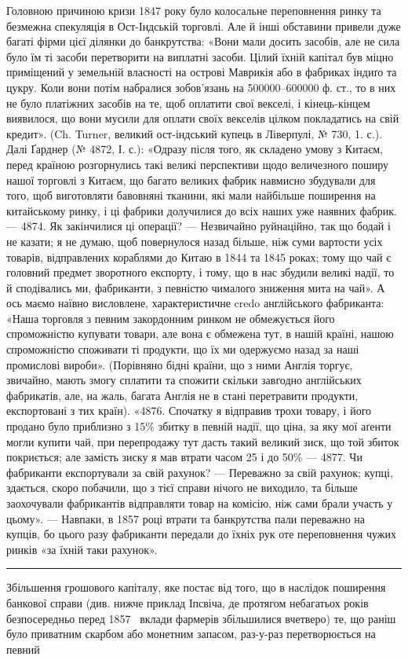 Головною причиною кризи 1847 року було колосальне переповнення ринку
та безмежна спекуляція в Ост-Індській торговлі. Але й інші обставини привели
дуже багаті фірми цієї ділянки до банкрутства: «Вони мали досить засобів, але не
сила було їм ті засоби перетворити на виплатні засоби. Цілий їхній капітал був міцно
приміщений у земельній власності на острові Маврикія або в фабриках індиґо та
цукру. Коли вони потім набралися зобов’язань на 500000--600000 ф. ст., то
в них не було платіжних засобів на те, щоб оплатити свої векселі, і кінець-кінцем
виявилося, що вони мусили для оплати своїх векселів цілком покладатись
на свій кредит». (Ch. Turner, великий ост-індський купець в Ліверпулі, № 730,
1. с.). Далі Ґарднер (№ 4872, І. с.): «Одразу після того, як складено умову
з Китаєм, перед країною розгорнулись такі великі перспективи щодо величезного
поширу нашої торговлі з Китаєм, що багато великих фабрик навмисно збудували
для того, щоб виготовляти бавовняні тканини, які мали найбільше поширення на китайському
ринку, і ці фабрики долучилися до всіх наших уже наявних фабрик. —
4874. Як закінчилися ці операції? — Незвичайно руйнаційно, так що бодай і не казати;
я не думаю, щоб повернулося назад більше, ніж  суми вартости усіх товарів,
відправлених кораблями до Китаю в 1844 та 1845 роках; тому що чай є головний
предмет зворотного експорту, і тому, що в нас збудили великі надії, то й сподівались ми,
фабриканти, з певністю чималого зниження мита на чай». А ось маємо наївно висловлене,
характеристичне credo англійського фабриканта: «Наша торговля з певним
закордонним ринком не обмежується його спроможністю купувати товари, але вона
є обмежена тут, в нашій країні, нашою спроможністю споживати ті продукти,
що їх ми одержуємо назад за наші промислові вироби». (Порівняно бідні країни,
що з ними Англія торгує, звичайно, мають змогу сплатити та спожити скільки
завгодно англійських фабрикатів, але, на жаль, багата Англія не в стані перетравити
продукти, експортовані з тих країн). «4876. Спочатку я відправив трохи
товару, і його продано було приблизно з 15\% збитку в певній надії, що ціна, за
яку мої аґенти могли купити чай, при перепродажу тут дасть такий великий
зиск, що той збиток покриється; але замість зиску я мав втрати часом 25 і до
50\% — 4877. Чи фабриканти експортували за свій рахунок? — Переважно за свій
рахунок; купці, здається, скоро побачили, що з тієї справи нічого не виходило, та
більше заохочували фабрикантів відправляти товар на комісію, ніж сами брали
участь у цьому». — Навпаки, в 1857 році втрати та банкрутства пали переважно
на купців, бо цього разу фабриканти передали до їхніх рук оте переповнення чужих
ринків «за їхній таки рахунок».

\pfbreak

Збільшення грошового капіталу, яке постає від того, що в наслідок поширення
банкової справи (див. нижче приклад Іпсвіча, де протягом небагатьох років
безпосередньо перед 1857~ вклади фармерів збільшилися вчетверо) те, що раніш було
приватним скарбом або монетним запасом, раз-у-раз перетворюється на певний
\parbreak{}  %
